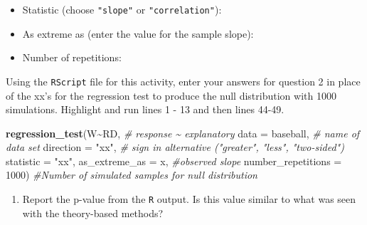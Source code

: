 \documentclass[
]{report}
\newenvironment{Shaded}{\begin{snugshade}}{\end{snugshade}}
\newcommand{\CommentTok}[1]{\textcolor[rgb]{0.56,0.35,0.01}{\textit{#1}}}
\newcommand{\DataTypeTok}[1]{\textcolor[rgb]{0.13,0.29,0.53}{#1}}
\newcommand{\DecValTok}[1]{\textcolor[rgb]{0.00,0.00,0.81}{#1}}
\newcommand{\KeywordTok}[1]{\textcolor[rgb]{0.13,0.29,0.53}{\textbf{#1}}}
\newcommand{\NormalTok}[1]{#1}
\newcommand{\OperatorTok}[1]{\textcolor[rgb]{0.81,0.36,0.00}{\textbf{#1}}}
\newcommand{\StringTok}[1]{\textcolor[rgb]{0.31,0.60,0.02}{#1}}
\providecommand{\tightlist}{%
  \setlength{\itemsep}{0pt}\setlength{\parskip}{0pt}}
\begin{document}
\vspace{.2in}

\begin{itemize}
\tightlist
\item
  Statistic (choose \texttt{"slope"} or \texttt{"correlation"}):
\end{itemize}

\vspace{.2in}

\begin{itemize}
\tightlist
\item
  As extreme as (enter the value for the sample slope):
\end{itemize}

\vspace{0.2in}

\begin{itemize}
\tightlist
\item
  Number of repetitions:
\end{itemize}

\vspace{.2in}

Using the \texttt{RScript} file for this activity, enter your answers for question 2 in place of the xx's for the regression test to produce the null distribution with 1000 simulations. Highlight and run lines 1 - 13 and then lines 44-49.

\begin{Shaded}
\begin{Highlighting}[]
\KeywordTok{regression\_test}\NormalTok{(W}\OperatorTok{\textasciitilde{}}\NormalTok{RD, }\CommentTok{\# response \textasciitilde{} explanatory}
               \DataTypeTok{data =}\NormalTok{ baseball, }\CommentTok{\# name of data set}
               \DataTypeTok{direction =} \StringTok{"xx"}\NormalTok{, }\CommentTok{\# sign in alternative ("greater", "less", "two{-}sided")}
               \DataTypeTok{statistic =} \StringTok{"xx"}\NormalTok{, }
               \DataTypeTok{as\_extreme\_as =}\NormalTok{ x, }\CommentTok{\#observed slope}
               \DataTypeTok{number\_repetitions =} \DecValTok{1000}\NormalTok{) }\CommentTok{\#Number of simulated samples for null distribution}
       
\end{Highlighting}
\end{Shaded}

\begin{enumerate}
\def\labelenumi{\arabic{enumi}.}
\setcounter{enumi}{2}
\tightlist
\item
  Report the p-value from the \texttt{R} output. Is this value similar to what was seen with the theory-based methods?
\end{enumerate}
\end{document}
